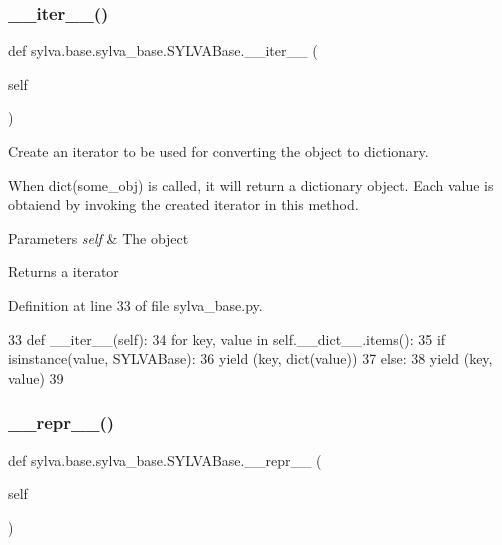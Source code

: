 \subsubsection{\texorpdfstring{\+\_\+\+\_\+iter\+\_\+\+\_\+()}{\_\_iter\_\_()}}
{\footnotesize\ttfamily def sylva.\+base.\+sylva\+\_\+base.\+S\+Y\+L\+V\+A\+Base.\+\_\+\+\_\+iter\+\_\+\+\_\+ (\begin{DoxyParamCaption}\item[{}]{self }\end{DoxyParamCaption})}



Create an iterator to be used for converting the object to dictionary. 

When dict(some\+\_\+obj) is called, it will return a dictionary object. Each value is obtaiend by invoking the created iterator in this method.


\begin{DoxyParams}{Parameters}
{\em self} & The object\\
\hline
\end{DoxyParams}
\begin{DoxyReturn}{Returns}
a iterator 
\end{DoxyReturn}


Definition at line 33 of file sylva\+\_\+base.\+py.


\begin{DoxyCode}
33     \textcolor{keyword}{def }\_\_iter\_\_(self):
34         \textcolor{keywordflow}{for} key, value \textcolor{keywordflow}{in} self.\_\_dict\_\_.items():
35             \textcolor{keywordflow}{if} isinstance(value, SYLVABase):
36                 \textcolor{keywordflow}{yield} (key, dict(value))
37             \textcolor{keywordflow}{else}:
38                 \textcolor{keywordflow}{yield} (key, value)
39 
\end{DoxyCode}
\mbox{\label{classsylva_1_1base_1_1sylva__base_1_1_s_y_l_v_a_base_a5bd08c41ab09c380433d0de82fb98860}} 
\subsubsection{\texorpdfstring{\+\_\+\+\_\+repr\+\_\+\+\_\+()}{\_\_repr\_\_()}}
{\footnotesize\ttfamily def sylva.\+base.\+sylva\+\_\+base.\+S\+Y\+L\+V\+A\+Base.\+\_\+\+\_\+repr\+\_\+\+\_\+ (\begin{DoxyParamCaption}\item[{}]{self }\end{DoxyParamCaption})}



